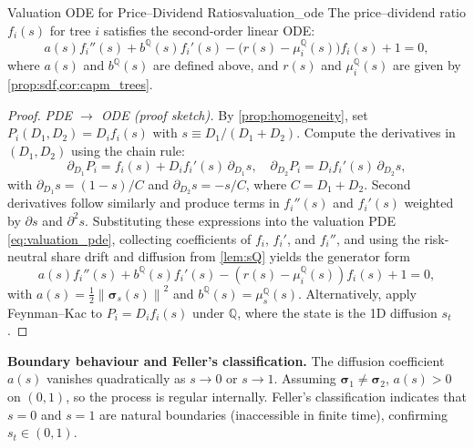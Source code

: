 ﻿\documentclass[11pt,letterpaper,oneside]{article}
\numberwithin{equation}{section}
\newcommand{\1}{\mathbf{1}}
\newcommand{\norm}[1]{\left\lVert #1\right\rVert}
\begin{document}
\begin{theorem}{Valuation ODE for Price--Dividend Ratios}{valuation_ode}
The price--dividend ratio $f_i(s)$ for tree $i$ satisfies the second-order linear ODE:
\begin{equation}\label{eq:ode_price}
  a(s) f_i''(s) + b^{\mathbb{Q}}(s) f_i'(s) - \big(r(s)-\mu_i^{\mathbb{Q}}(s)\big) f_i(s) + 1 = 0,
\end{equation}
where $a(s)$ and $b^{\mathbb{Q}}(s)$ are defined above, and $r(s)$ and $\mu_i^{\mathbb{Q}}(s)$ are given by \cref{prop:sdf,cor:capm_trees}.
\end{theorem}
\begin{proof}
\emph{PDE $\to$ ODE (proof sketch).} By \cref{prop:homogeneity}, set $P_i(D_1,D_2)=D_i f_i(s)$ with $s\equiv D_1/(D_1+D_2)$. Compute the derivatives in $(D_1,D_2)$ using the chain rule:
\[
  \partial_{D_1} P_i = f_i(s) + D_i f_i'(s)\,\partial_{D_1}s,\quad
  \partial_{D_2} P_i = D_i f_i'(s)\,\partial_{D_2}s,
\]
with $\partial_{D_1}s = (1-s)/C$ and $\partial_{D_2}s = -s/C$, where $C=D_1+D_2$. Second derivatives follow similarly and produce terms in $f_i''(s)$ and $f_i'(s)$ weighted by $\partial s$ and $\partial^2 s$. Substituting these expressions into the valuation PDE \eqref{eq:valuation_pde}, collecting coefficients of $f_i$, $f_i'$, and $f_i''$, and using the risk-neutral share drift and diffusion from \cref{lem:sQ} yields the generator form
\[
  a(s) f_i''(s) + b^{\mathbb{Q}}(s) f_i'(s) - (r(s)-\mu_i^{\mathbb{Q}}(s)) f_i(s) + 1 = 0,
\]
with $a(s)=\tfrac12\norm{\bm{\sigma}_s(s)}^2$ and $b^{\mathbb{Q}}(s)=\mu_s^{\mathbb{Q}}(s)$. Alternatively, apply Feynman--Kac to $P_i=D_i f_i(s)$ under $\mathbb{Q}$, where the state is the 1D diffusion $s_t$.
\end{proof}

\begin{tcolorbox}[mathstyle]
  	\textbf{Boundary behaviour and Feller's classification.} The diffusion coefficient $a(s)$ vanishes quadratically as $s\to0$ or $s\to1$. Assuming $\bm{\sigma}_1\neq\bm{\sigma}_2$, $a(s)>0$ on $(0,1)$, so the process is regular internally. Feller's classification indicates that $s=0$ and $s=1$ are natural boundaries (inaccessible in finite time), confirming $s_t\in(0,1)$.
\end{tcolorbox}
\end{document}
